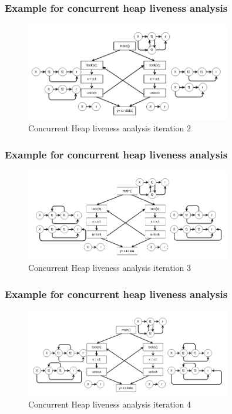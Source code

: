\documentclass{beamer}
\begin{document}
\begin{frame}
	\frametitle{Example for concurrent heap liveness analysis}
	\begin{figure}
		\centering
		\includegraphics[width=0.8\textwidth]{Figures/conc_analysis_itr2.png}
		\caption{Concurrent Heap liveness analysis iteration 2}
		\label{fig:nullpointeranalysis}
	\end{figure}
\end{frame}

\begin{frame}
	\frametitle{Example for concurrent heap liveness analysis}
	\begin{figure}
		\centering
		\includegraphics[width=0.8\textwidth]{Figures/conc_analysis_itr3.png}
		\caption{Concurrent Heap liveness analysis iteration 3}
		\label{fig:nullpointeranalysis}
	\end{figure}
\end{frame}

\begin{frame}
	\frametitle{Example for concurrent heap liveness analysis}
	\begin{figure}
		\centering
		\includegraphics[width=0.8\textwidth]{Figures/conc_analysis_itr4.png}
		\caption{Concurrent Heap liveness analysis iteration 4}
		\label{fig:nullpointeranalysis}
	\end{figure}
\end{frame}
\end{document}
